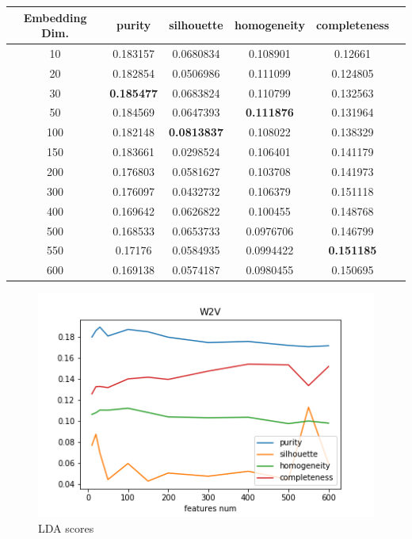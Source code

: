 \documentclass[11pt]{article}
\begin{document}
\begin{center}
\begin{tabular}{ |c|c|c|c|c|c| }
\hline
Embedding Dim.  & purity  & silhouette  & homogeneity  & completeness\\ \hline 
10  & 0.183157  & 0.0680834  & 0.108901  & 0.12661\\ \hline 
20  & 0.182854  & 0.0506986  & 0.111099  & 0.124805\\ \hline 
30  & \textbf{0.185477}  & 0.0683824  & 0.110799  & 0.132563\\ \hline 
50  & 0.184569  & 0.0647393  & \textbf{0.111876}  & 0.131964\\ \hline 
100  & 0.182148  & \textbf{0.0813837}  & 0.108022  & 0.138329\\ \hline 
150  & 0.183661  & 0.0298524  & 0.106401  & 0.141179\\ \hline 
200  & 0.176803  & 0.0581627  & 0.103708  & 0.141973\\ \hline 
300  & 0.176097  & 0.0432732  & 0.106379  & 0.151118\\ \hline 
400  & 0.169642  & 0.0626822  & 0.100455  & 0.148768\\ \hline 
500  & 0.168533  & 0.0653733  & 0.0976706  & 0.146799\\ \hline 
550  & 0.17176  & 0.0584935  & 0.0994422  & \textbf{0.151185}\\ \hline 
600  & 0.169138  & 0.0574187  & 0.0980455  & 0.150695\\ \hline \end{tabular}
\end{center}
\FloatBarrier

\begin{figure}[h]
\centering
 	\includegraphics[scale=0.7]{w2v_scores.png}
	\caption{LDA scores}
\label{w2v_scores}
\end{figure}
\FloatBarrier
\end{document}
